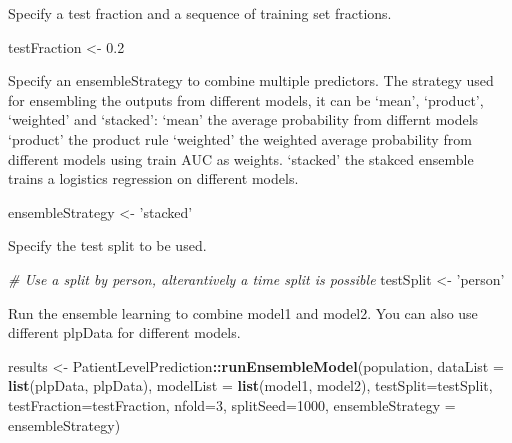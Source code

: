\documentclass[]{article}
\newenvironment{Shaded}{\begin{snugshade}}{\end{snugshade}}
\newcommand{\KeywordTok}[1]{\textcolor[rgb]{0.13,0.29,0.53}{\textbf{#1}}}
\newcommand{\DataTypeTok}[1]{\textcolor[rgb]{0.13,0.29,0.53}{#1}}
\newcommand{\DecValTok}[1]{\textcolor[rgb]{0.00,0.00,0.81}{#1}}
\newcommand{\FloatTok}[1]{\textcolor[rgb]{0.00,0.00,0.81}{#1}}
\newcommand{\StringTok}[1]{\textcolor[rgb]{0.31,0.60,0.02}{#1}}
\newcommand{\CommentTok}[1]{\textcolor[rgb]{0.56,0.35,0.01}{\textit{#1}}}
\newcommand{\OperatorTok}[1]{\textcolor[rgb]{0.81,0.36,0.00}{\textbf{#1}}}
\newcommand{\NormalTok}[1]{#1}
\begin{document}
Specify a test fraction and a sequence of training set fractions.

\begin{Shaded}
\begin{Highlighting}[]
\NormalTok{testFraction <-}\StringTok{ }\FloatTok{0.2}
\end{Highlighting}
\end{Shaded}

Specify an ensembleStrategy to combine multiple predictors. The strategy
used for ensembling the outputs from different models, it can be `mean',
`product', `weighted' and `stacked': `mean' the average probability from
differnt models `product' the product rule `weighted' the weighted
average probability from different models using train AUC as weights.
`stacked' the stakced ensemble trains a logistics regression on
different models.

\begin{Shaded}
\begin{Highlighting}[]
\NormalTok{ensembleStrategy <-}\StringTok{ 'stacked'}
\end{Highlighting}
\end{Shaded}

Specify the test split to be used.

\begin{Shaded}
\begin{Highlighting}[]
\CommentTok{# Use a split by person, alterantively a time split is possible}
\NormalTok{testSplit <-}\StringTok{ 'person'}
\end{Highlighting}
\end{Shaded}

Run the ensemble learning to combine model1 and model2. You can also use
different plpData for different models.

\begin{Shaded}
\begin{Highlighting}[]
\NormalTok{results <-}\StringTok{ }\NormalTok{PatientLevelPrediction}\OperatorTok{::}\KeywordTok{runEnsembleModel}\NormalTok{(population, }
                                   \DataTypeTok{dataList =} \KeywordTok{list}\NormalTok{(plpData, plpData), }
                                   \DataTypeTok{modelList =} \KeywordTok{list}\NormalTok{(model1, model2),}
                                   \DataTypeTok{testSplit=}\NormalTok{testSplit,}
                                   \DataTypeTok{testFraction=}\NormalTok{testFraction,}
                                   \DataTypeTok{nfold=}\DecValTok{3}\NormalTok{, }\DataTypeTok{splitSeed=}\DecValTok{1000}\NormalTok{, }
                                   \DataTypeTok{ensembleStrategy =}\NormalTok{ ensembleStrategy) }
\end{Highlighting}
\end{Shaded}
\end{document}
